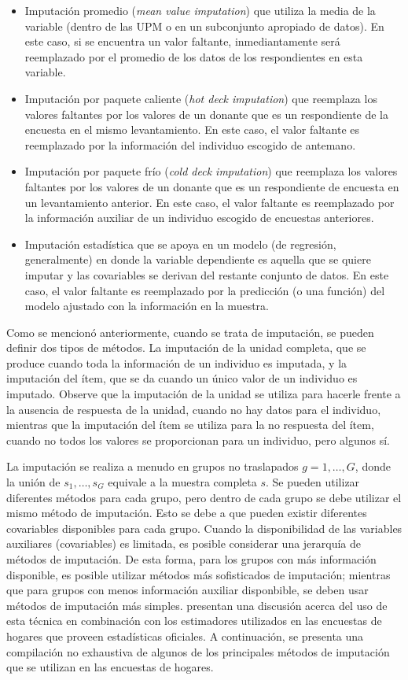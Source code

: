 \begin{itemize}
\tightlist
\item
  Imputación promedio (\emph{mean value imputation}) que utiliza la media de la variable (dentro de las UPM o en un subconjunto apropiado de datos). En este caso, si se encuentra un valor faltante, inmediantamente será reemplazado por el promedio de los datos de los respondientes en esta variable.
\item
  Imputación por paquete caliente (\emph{hot deck imputation}) que reemplaza los valores faltantes por los valores de un donante que es un respondiente de la encuesta en el mismo levantamiento. En este caso, el valor faltante es reemplazado por la información del individuo escogido de antemano.
\item
  Imputación por paquete frío (\emph{cold deck imputation}) que reemplaza los valores faltantes por los valores de un donante que es un respondiente de encuesta en un levantamiento anterior. En este caso, el valor faltante es reemplazado por la información auxiliar de un individuo escogido de encuestas anteriores.
\item
  Imputación estadística que se apoya en un modelo (de regresión, generalmente) en donde la variable dependiente es aquella que se quiere imputar y las covariables se derivan del restante conjunto de datos. En este caso, el valor faltante es reemplazado por la predicción (o una función) del modelo ajustado con la información en la muestra.
\end{itemize}

Como se mencionó anteriormente, cuando se trata de imputación, se pueden definir dos tipos de métodos. La imputación de la unidad completa, que se produce cuando toda la información de un individuo es imputada, y la imputación del ítem, que se da cuando un único valor de un individuo es imputado. Observe que la imputación de la unidad se utiliza para hacerle frente a la ausencia de respuesta de la unidad, cuando no hay datos para el individuo, mientras que la imputación del ítem se utiliza para la no respuesta del ítem, cuando no todos los valores se proporcionan para un individuo, pero algunos sí.

La imputación se realiza a menudo en grupos no traslapados \(g= 1, \ldots, G\), donde la unión de \(s_1, \ldots, s_G\) equivale a la muestra completa \(s\). Se pueden utilizar diferentes métodos para cada grupo, pero dentro de cada grupo se debe utilizar el mismo método de imputación. Esto se debe a que pueden existir diferentes covariables disponibles para cada grupo. Cuando la disponibilidad de las variables auxiliares (covariables) es limitada, es posible considerar una jerarquía de métodos de imputación. De esta forma, para los grupos con más información disponible, es posible utilizar métodos más sofisticados de imputación; mientras que para grupos con menos información auxiliar disponbible, se deben usar métodos de imputación más simples. \citet{Sarndal_Lundstrom_2006} presentan una discusión acerca del uso de esta técnica en combinación con los estimadores utilizados en las encuestas de hogares que proveen estadísticas oficiales. A continuación, se presenta una compilación no exhaustiva de algunos de los principales métodos de imputación que se utilizan en las encuestas de hogares.

